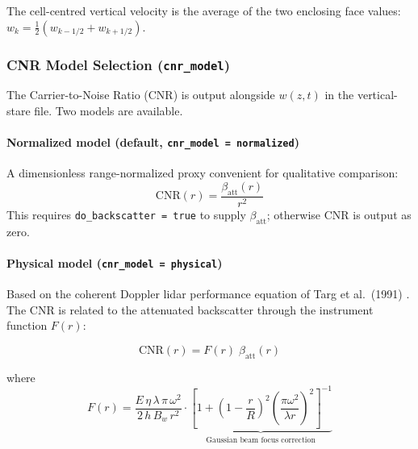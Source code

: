 \documentclass[11pt,letterpaper]{article}
\begin{document}
The cell-centred vertical velocity is the average of the two enclosing face values:
$w_k = \tfrac{1}{2}(w_{k-1/2} + w_{k+1/2})$.

\subsubsection{CNR Model Selection (\texttt{cnr\_model})}

The Carrier-to-Noise Ratio (CNR) is output alongside $w(z,t)$ in the vertical-stare file.
Two models are available.

\paragraph{Normalized model (default, \texttt{cnr\_model = normalized})}

A dimensionless range-normalized proxy convenient for qualitative comparison:
\begin{equation}
  \mathrm{CNR}(r) = \frac{\beta_\mathrm{att}(r)}{r^2}
  \label{eq:cnr_normalized}
\end{equation}
This requires \texttt{do\_backscatter = true} to supply $\beta_\mathrm{att}$;
otherwise CNR is output as zero.

\paragraph{Physical model (\texttt{cnr\_model = physical})}

Based on the coherent Doppler lidar performance equation of Targ et al.\ (1991)
\cite{Targ1991}.  The CNR is related to the attenuated backscatter through the
instrument function $F(r)$:

\begin{equation}
  \boxed{\mathrm{CNR}(r) = F(r)\;\beta_\mathrm{att}(r)}
  \label{eq:cnr_physical}
\end{equation}

where
\begin{equation}
  F(r) = \frac{E\,\eta\,\lambda\,\pi\,\omega^2}{2\,h\,B_w\,r^2}
  \cdot\underbrace{\left[1 + \left(1-\frac{r}{R}\right)^2
    \!\left(\frac{\pi\omega^2}{\lambda r}\right)^{\!2}\right]^{-1}}_{\text{Gaussian beam focus correction}}
  \label{eq:F_targ}
\end{equation}
\end{document}
